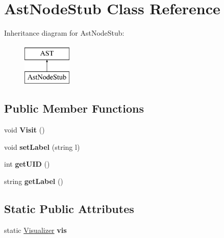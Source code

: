 \hypertarget{classAstNodeStub}{\section{Ast\-Node\-Stub Class Reference}
\label{classAstNodeStub}
}
Inheritance diagram for Ast\-Node\-Stub\-:\begin{figure}[H]
\begin{center}
\leavevmode
\includegraphics[height=2.000000cm]{classAstNodeStub}
\end{center}
\end{figure}
\subsection*{Public Member Functions}
\begin{DoxyCompactItemize}
\item 
\hypertarget{classAstNodeStub_a87dedc7e513f3862d51ef8415a01aee7}{void {\bfseries Visit} ()}\label{classAstNodeStub_a87dedc7e513f3862d51ef8415a01aee7}

\item 
\hypertarget{classAST_a71d680856e95ff89f55d5311a552eba6}{void {\bfseries set\-Label} (string l)}\label{classAST_a71d680856e95ff89f55d5311a552eba6}

\item 
\hypertarget{classAST_ab7a5b1d9f1c2de0d98deb356f724a42c}{int {\bfseries get\-U\-I\-D} ()}\label{classAST_ab7a5b1d9f1c2de0d98deb356f724a42c}

\item 
\hypertarget{classAST_aee029be902fffc927d16ccb03eb922ad}{string {\bfseries get\-Label} ()}\label{classAST_aee029be902fffc927d16ccb03eb922ad}

\end{DoxyCompactItemize}
\subsection*{Static Public Attributes}
\begin{DoxyCompactItemize}
\item 
\hypertarget{classAST_aca9e6637209b31e03a09c0d42f29bdfa}{static \hyperlink{classVisualizer}{Visualizer} {\bfseries vis}}\label{classAST_aca9e6637209b31e03a09c0d42f29bdfa}

\end{DoxyCompactItemize}
